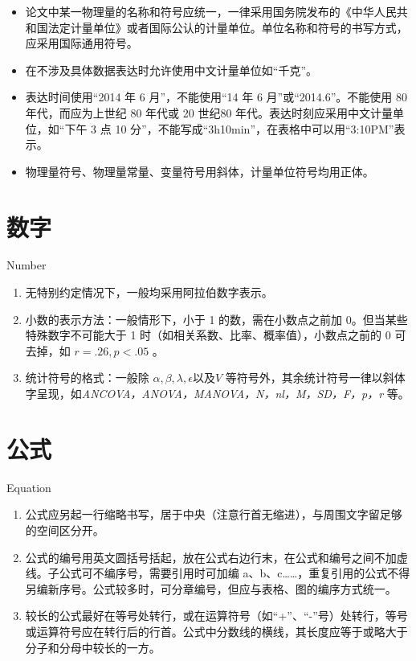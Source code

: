 \begin{itemize}
	\item  论文中某一物理量的名称和符号应统一，一律采用国务院发布的《中华人民共和国法定计量单位》或者国际公认的计量单位。单位名称和符号的书写方式，应采用国际通用符号。
	\item 在不涉及具体数据表达时允许使用中文计量单位如“千克”。
	\item 表达时间使用“2014 年 6 月”，不能使用“14 年 6 月”或“2014.6”。不能使用 80 年代，而应为上世纪 80 年代或 20 世纪80 年代。表达时刻应采用中文计量单位，如“下午 3 点 10 分”，不能写成“3h10min”，在表格中可以用“3:10PM”表示。
	\item 物理量符号、物理量常量、变量符号用斜体，计量单位符号均用正体。
\end{itemize}

\section{数字}{Number }

\begin{enumerate}
	\item 无特别约定情况下，一般均采用阿拉伯数字表示。
	\item 小数的表示方法：一般情形下，小于 1 的数，需在小数点之前加 0。但当某些特殊数字不可能大于 1 时（如相关系数、比率、概率值），小数点之前的 0 可去掉，如  $ r=.26,p<.05 $  。
	\item  统计符号的格式：一般除  $ \alpha , \beta , \lambda , \epsilon \text{以及} V $ 等符号外，其余统计符号一律以斜体字呈现，如\textit{ANCOVA，ANOVA，MANOVA，N，nl，M，SD，F，p，r } 等。
\end{enumerate}


\section{公式}{Equation}

\begin{enumerate}
	\item 公式应另起一行缩略书写，居于中央（注意行首无缩进），与周围文字留足够的空间区分开。
	\item 公式的编号用英文圆括号括起，放在公式右边行末，在公式和编号之间不加虚线。子公式可不编序号，需要引用时可加编 a、b、c……，重复引用的公式不得另编新序号。公式较多时，可分章编号，但应与表格、图的编序方式统一。
	\item 较长的公式最好在等号处转行，或在运算符号（如“+”、“-”号）处转行，等号或运算符号应在转行后的行首。公式中分数线的横线，其长度应等于或略大于分子和分母中较长的一方。
\end{enumerate}

